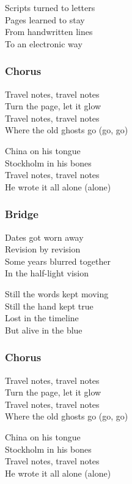 \documentclass[]{article}
\begin{document}
Scripts turned to letters\\
Pages learned to stay\\
From handwritten lines\\
To an electronic way

\subsubsection{Chorus}\label{chorus-53}

Travel notes, travel notes\\
Turn the page, let it glow\\
Travel notes, travel notes\\
Where the old ghosts go (go, go)

China on his tongue\\
Stockholm in his bones\\
Travel notes, travel notes\\
He wrote it all alone (alone)

\subsubsection{Bridge}\label{bridge-15}

Dates got worn away\\
Revision by revision\\
Some years blurred together\\
In the half-light vision

Still the words kept moving\\
Still the hand kept true\\
Lost in the timeline\\
But alive in the blue

\subsubsection{Chorus}\label{chorus-54}

Travel notes, travel notes\\
Turn the page, let it glow\\
Travel notes, travel notes\\
Where the old ghosts go (go, go)

China on his tongue\\
Stockholm in his bones\\
Travel notes, travel notes\\
He wrote it all alone (alone)
\end{document}
